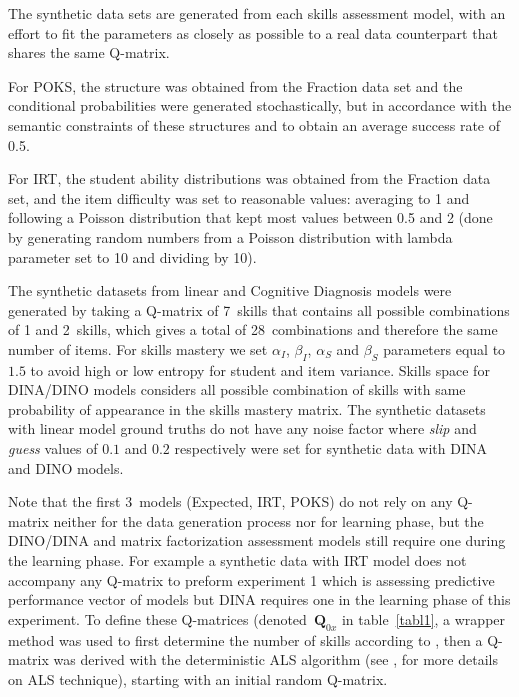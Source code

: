 The synthetic data sets are generated from each skills assessment model, with an effort to fit the parameters as closely as possible to a real data counterpart that shares the same Q-matrix.  

For POKS, the structure was obtained from the Fraction data set and the conditional probabilities were generated stochastically, but in accordance with the semantic constraints of these structures and to obtain an average success rate of 0.5.

For IRT, the student ability distributions was obtained from the Fraction data set, and the item difficulty was set to reasonable values: averaging to 1 and following a Poisson distribution that kept most values between 0.5 and 2 (done by generating random numbers from a Poisson distribution with lambda parameter set to 10 and dividing by 10). 

The synthetic datasets from linear and Cognitive Diagnosis models were generated by taking a Q-matrix of 7~skills that contains all possible combinations of 1 and 2~skills, which gives a total of 28~combinations and therefore the same number of items. For skills mastery we set $\alpha_I$, $\beta_I$, $\alpha_S$ and $\beta_S$ parameters equal to $1.5$ to avoid high or low entropy for student and item variance. Skills space for DINA/DINO models considers all possible combination of skills with same probability of appearance in the skills mastery matrix. 
The synthetic datasets with linear model ground truths do not have any noise factor where \textit{slip} and \textit{guess} values of $0.1$ and $0.2$ respectively were set for synthetic data with DINA and DINO models.

Note that the first 3~models (Expected, IRT, POKS) do not rely on any Q-matrix neither for the data generation process nor for learning phase, but the DINO/DINA and matrix factorization assessment models still require one during the learning phase. For example a synthetic data with IRT model does not accompany any Q-matrix to preform experiment 1 which is assessing predictive performance vector of models but DINA requires one in the learning phase of this experiment. To define these Q-matrices (denoted~$\mathbf{Q}_{0x}$ in table~\ref{tabl1}, a wrapper method was used to first determine the number of skills according to \citet{Beheshti2012Numbers}, then a Q-matrix was derived with the deterministic ALS algorithm (see \citealp{Desmarais2013aied}, for more details on ALS technique), starting with an initial random Q-matrix.



